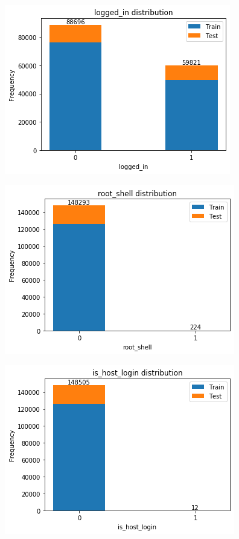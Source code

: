 \includegraphics[width=0.9\linewidth]{img/cat2.png}

\includegraphics[width=0.9\linewidth]{img/cat3.png}

\includegraphics[width=0.9\linewidth]{img/cat4.png}

